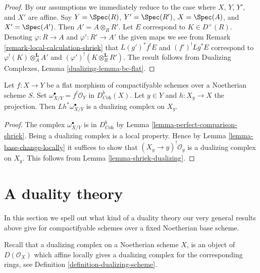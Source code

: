 \begin{proof}
By our assumptions we immediately reduce to the case where
$X$, $Y$, $Y'$, and $X'$ are affine.
Say $Y = \Spec(R)$, $Y' = \Spec(R')$, $X = \Spec(A)$, and $X' = \Spec(A')$.
Then $A' = A \otimes_R R'$. Let
$E$ correspond to $K \in D^+(R)$.
Denoting $\varphi : R \to A$ and $\varphi' : R' \to A'$
the given maps we see from
Remark \ref{remark-local-calculation-shriek}
that $L(g')^*f^!E$ and $(f')^!Lg^*E$ correspond to
$\varphi^!(K) \otimes_A^\mathbf{L} A'$ and
$(\varphi')^!(K \otimes_R^\mathbf{L} R')$.
The result follows from
Dualizing Complexes, Lemma \ref{dualizing-lemma-bc-flat}.
\end{proof}

\begin{lemma}
\label{lemma-relative-dualizing-fibres}
Let $f : X \to Y$ be a flat morphism of compactifyable schemes over
a Noetherian scheme $S$. Set
$\omega_{X/Y}^\bullet = f^!\mathcal{O}_Y$ in $D^b_{\textit{Coh}}(X)$.
Let $y \in Y$ and $h : X_y \to X$ the projection.
Then $Lh^*\omega_{X/Y}^\bullet$ is a dualizing complex
on $X_y$.
\end{lemma}

\begin{proof}
The complex $\omega_{X/Y}^\bullet$ is in $D^b_{\textit{Coh}}$
by Lemma \ref{lemma-perfect-comparison-shriek}.
Being a dualizing complex is a local property.
Hence by Lemma \ref{lemma-base-change-locally}
it suffices to show that $(X_y \to y)^!\mathcal{O}_y$
is a dualizing complex on $X_y$.
This follows from Lemma \ref{lemma-shriek-dualizing}.
\end{proof}








\section{A duality theory}
\label{section-duality}

\noindent
In this section we spell out what kind of a duality theory
our very general results above give for compactifyable schemes
over a fixed Noetherian base scheme.

\medskip\noindent
Recall that a dualizing complex on a Noetherian scheme $X$, is an
object of $D(\mathcal{O}_X)$ which affine locally gives a dualizing
complex for the corresponding rings, see
Definition \ref{definition-dualizing-scheme}.

